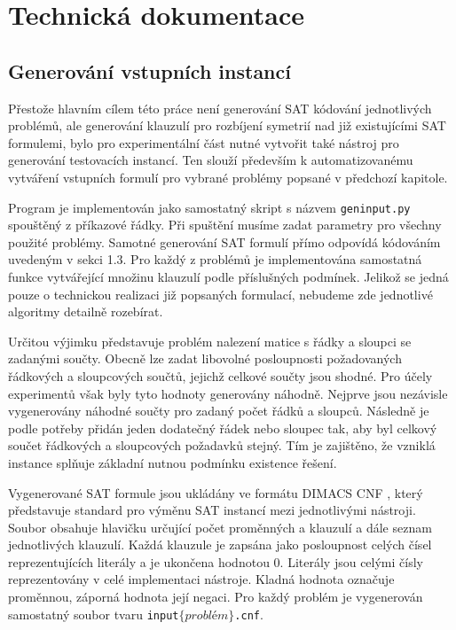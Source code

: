 
\chapter{Technická dokumentace}
\section{Generování vstupních instancí}

Přestože hlavním cílem této práce není generování SAT kódování jednotlivých problémů, ale generování klauzulí pro rozbíjení symetrií nad již existujícími SAT formulemi, bylo pro experimentální část nutné vytvořit také nástroj pro generování testovacích instancí. Ten slouží především k automatizovanému vytváření vstupních formulí pro vybrané problémy popsané v předchozí kapitole.

Program je implementován jako samostatný skript s názvem \texttt{geninput.py} spouštěný z příkazové řádky. Při spuštění musíme zadat parametry pro všechny použité problémy. Samotné generování SAT formulí přímo odpovídá kódováním uvedeným v sekci 1.3. Pro každý z problémů je implementována samostatná funkce vytvářející množinu klauzulí podle příslušných podmínek. Jelikož se jedná pouze o technickou realizaci již popsaných formulací, nebudeme zde jednotlivé algoritmy detailně rozebírat.

Určitou výjimku představuje problém nalezení matice s řádky a sloupci se zadanými součty. Obecně lze zadat libovolné posloupnosti požadovaných řádkových a sloupcových součtů, jejichž celkové součty jsou shodné. Pro účely experimentů však byly tyto hodnoty generovány náhodně. Nejprve jsou nezávisle vygenerovány náhodné součty pro zadaný počet řádků a sloupců. Následně je podle potřeby přidán jeden dodatečný řádek nebo sloupec tak, aby byl celkový součet řádkových a sloupcových požadavků stejný. Tím je zajištěno, že vzniklá instance splňuje základní nutnou podmínku existence řešení.

Vygenerované SAT formule jsou ukládány ve formátu DIMACS CNF \cite{dimacs1993cnf}, který představuje standard pro výměnu SAT instancí mezi jednotlivými nástroji. Soubor obsahuje hlavičku určující počet proměnných a klauzulí a dále seznam jednotlivých klauzulí. Každá klauzule je zapsána jako posloupnost celých čísel reprezentujících literály a je ukončena hodnotou $0$. Literály jsou celými čísly reprezentovány v celé implementaci nástroje. Kladná hodnota označuje proměnnou, záporná hodnota její negaci. Pro každý problém je vygenerován samostatný soubor tvaru \texttt{input$\{problém\}$.cnf}.

